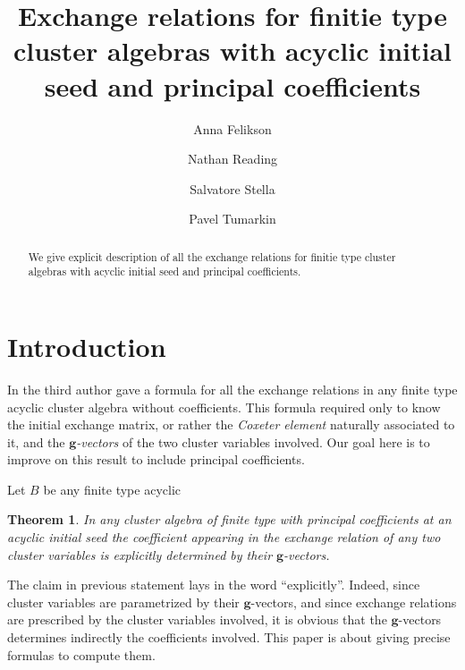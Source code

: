 \documentclass[11pt]{amsart}
\newcommand{\bfg}{\mathbf{g}}
\newtheorem{theorem}{Theorem}[section]
\numberwithin{equation}{section}
\begin{document}
\title[Exchange relations for finite type]{Exchange relations for finitie type cluster algebras with acyclic initial seed and principal coefficients}

\author[Felikson]{Anna Felikson}
\address[Anna Felikson]{Durham University}

\author[Reading]{Nathan Reading}
\address[Nathan Reading]{North Carolina State Univesity}

\author[Stella]{Salvatore Stella}
\address[Salvatore Stella]{IN$d$AM - Marie Curie Actions fellow, Universit\`a\`{ }La Sapienza'', Roma, Italy.}

\author[tumarkin]{Pavel Tumarkin}
\address[Pavel Tumarkin]{Durham University}

\begin{abstract}
We give explicit description of all the exchange relations for finitie type cluster algebras with acyclic initial seed and principal coefficients.
\end{abstract}

\maketitle

\section{Introduction}
In \cite{Ste13} the third author gave a formula for all the exchange relations in any finite type acyclic cluster algebra without coefficients.
This formula required only to know the initial exchange matrix, or rather the \emph{Coxeter element} naturally associated to it, and the \emph{$\bfg$-vectors} of the two cluster variables involved.
Our goal here is to improve on this result to include principal coefficients.

Let $B$ be any finite type acyclic 

\begin{theorem}
  In any cluster algebra of finite type with principal coefficients at an acyclic initial seed the coefficient appearing in the exchange relation of any two cluster variables is \emph{explicitly} determined by their $\bfg$-vectors. 
\end{theorem}

The claim in previous statement lays in the word ``explicitly''. 
Indeed, since cluster variables are parametrized by their $\bfg$-vectors, and since exchange relations are prescribed by the cluster variables involved, it is obvious that the $\bfg$-vectors determines indirectly the coefficients involved. 
This paper is about giving precise formulas to compute them.
\end{document}
